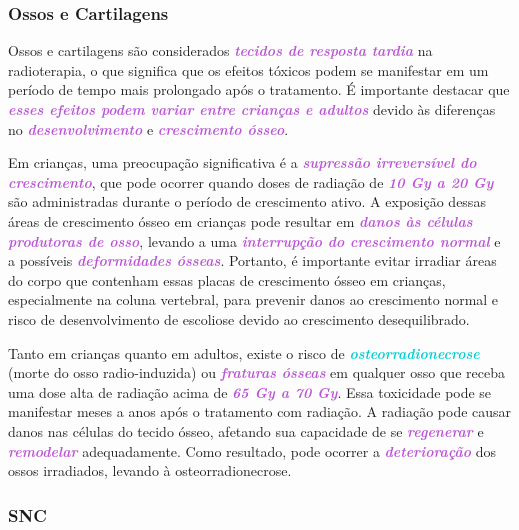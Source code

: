\documentclass[11pt,a4paper]{article}
\begin{document}
\subsubsection*{Ossos e Cartilagens}


	Ossos e cartilagens são considerados \textcolor{MediumOrchid}{\textbf{\textit{tecidos de resposta tardia}}} na radioterapia, o que significa que os efeitos tóxicos podem se manifestar em um período de tempo mais prolongado após o tratamento. É importante destacar que \textcolor{MediumOrchid}{\textbf{\textit{esses efeitos podem variar entre crianças e adultos}}} devido às diferenças no \textcolor{MediumOrchid}{\textbf{\textit{desenvolvimento}}} e \textcolor{MediumOrchid}{\textbf{\textit{crescimento ósseo}}}.

	Em crianças, uma preocupação significativa é a \textcolor{MediumOrchid}{\textbf{\textit{supressão irreversível do crescimento}}}, que pode ocorrer quando doses de radiação de \textcolor{MediumOrchid}{\textbf{\textit{10 Gy a 20 Gy}}} são administradas durante o período de crescimento ativo. A exposição dessas áreas de crescimento ósseo em crianças pode resultar em \textcolor{MediumOrchid}{\textbf{\textit{danos às células produtoras de osso}}}, levando a uma \textcolor{MediumOrchid}{\textbf{\textit{interrupção do crescimento normal}}} e a possíveis \textcolor{MediumOrchid}{\textbf{\textit{deformidades ósseas}}}. Portanto, é importante evitar irradiar áreas do corpo que contenham essas placas de crescimento ósseo em crianças, especialmente na coluna vertebral, para prevenir danos ao crescimento normal e risco de desenvolvimento de escoliose devido ao crescimento desequilibrado.

	Tanto em crianças quanto em adultos, existe o risco de \textcolor{DarkTurquoise}{\textbf{\textit{osteorradionecrose}}} (morte do osso radio-induzida) ou \textcolor{MediumOrchid}{\textbf{\textit{fraturas ósseas}}} em qualquer osso que receba uma dose alta de radiação acima de \textcolor{MediumOrchid}{\textbf{\textit{65 Gy a 70 Gy}}}. Essa toxicidade pode se manifestar meses a anos após o tratamento com radiação. A radiação pode causar danos nas células do tecido ósseo, afetando sua capacidade de se \textcolor{MediumOrchid}{\textbf{\textit{regenerar}}} e \textcolor{MediumOrchid}{\textbf{\textit{remodelar}}} adequadamente. Como resultado, pode ocorrer a \textcolor{MediumOrchid}{\textbf{\textit{deterioração}}} dos ossos irradiados, levando à osteorradionecrose.

\subsubsection*{SNC}
\end{document}
